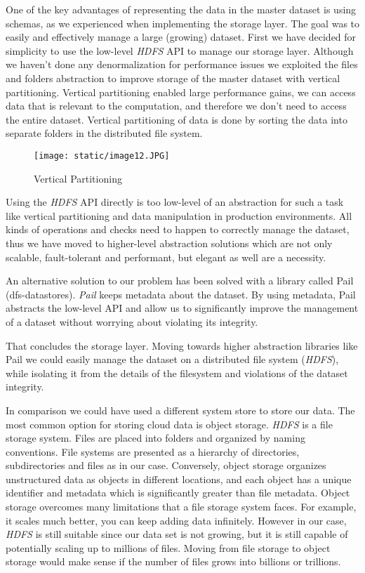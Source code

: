 \documentclass[format=acmsmall, review=false, screen=true]{acmart}
\begin{document}
One of the key advantages of representing the data in the master dataset is using schemas, as we experienced when implementing the storage layer. The goal was to easily and effectively manage a large (growing) dataset. First we have decided for simplicity to use the low-level \textit{HDFS} API to manage our storage layer. Although we haven’t done any denormalization for performance issues we exploited the files and folders abstraction to improve storage of the master dataset with vertical partitioning. Vertical partitioning enabled large performance gains, we can access data that is relevant to the computation, and therefore we don’t need to access the entire dataset. Vertical partitioning of data is done by sorting the data into separate folders in the distributed file system.

\begin{figure}[H]
  \texttt{[image: static/image12.JPG]}
  \caption{Vertical Partitioning}
  \label{fig:verticalpartitioning-diagram}
\end{figure}

Using the \textit{HDFS} API directly is too low-level of an abstraction for such a task like vertical partitioning and data manipulation in production environments. All kinds of operations and checks need to happen to correctly manage the dataset, thus we have moved to higher-level abstraction solutions which are not only scalable, fault-tolerant and performant, but elegant as well are a necessity.

An alternative solution to our problem has been solved with a library called Pail (dfs-datastores). \textit{Pail} keeps metadata about the dataset. By using metadata, Pail abstracts the low-level API and allow us to significantly improve the management of a dataset without worrying about violating its integrity.

That concludes the storage layer. Moving towards higher abstraction libraries like Pail we could easily manage the dataset on a distributed file system (\textit{HDFS}), while isolating it from the details of the filesystem and violations of the dataset integrity.

In comparison we could have used a different system store to store our data. The most common option for storing cloud data is object storage. \textit{HDFS} is a file storage system. Files are placed into folders and organized by naming conventions. File systems are presented as a hierarchy of directories, subdirectories and files as in our case. Conversely, object storage organizes unstructured data as objects in different locations, and each object has a unique identifier and metadata which is significantly greater than file metadata. Object storage overcomes many limitations that a file storage system faces. For example, it scales much better, you can keep adding data infinitely. However in our case, \textit{HDFS} is still suitable since our data set is not growing, but it is still capable of potentially scaling up to millions of files. Moving from file storage to object storage would make sense if the number of files grows into billions or trillions.
\end{document}
